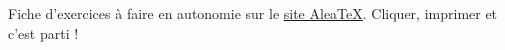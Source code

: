 \begin{aleatex}[][\aleatexLogo]
    Fiche d'exercices à faire en autonomie sur le \href{https://aleatex.mathslozano.fr/}{site Alea\TeX}. 
    Cliquer, imprimer et c'est parti !

    \begin{minipage}{\linewidth}    
    \end{minipage}
\end{aleatex}